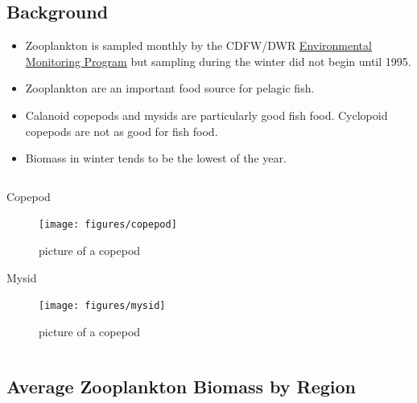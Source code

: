\documentclass[
]{book}
\providecommand{\tightlist}{%
  \setlength{\itemsep}{0pt}\setlength{\parskip}{0pt}}
\begin{document}
\begin{columns-nocenter}

\begin{column}

\hypertarget{background-3}{%
\subsection{Background}\label{background-3}}

\begin{itemize}
\tightlist
\item
  Zooplankton is sampled monthly by the CDFW/DWR \href{https://emp.baydeltalive.com/wiki/12297}{Environmental Monitoring Program} but sampling during the winter did not begin until 1995.
\item
  Zooplankton are an important food source for pelagic fish.
\item
  Calanoid copepods and mysids are particularly good fish food. Cyclopoid copepods are not as good for fish food.
\item
  Biomass in winter tends to be the lowest of the year.
\end{itemize}

\end{column}

\begin{column}

Copepod

\begin{figure}

{\centering \texttt{[image: figures/copepod]} 

}

\caption{picture of a copepod}\label{fig:unnamed-chunk-162}
\end{figure}

Mysid

\begin{figure}

{\centering \texttt{[image: figures/mysid]} 

}

\caption{picture of a copepod}\label{fig:unnamed-chunk-163}
\end{figure}

\end{column}

\end{columns-nocenter}

\hypertarget{average-zooplankton-biomass-by-region}{%
\subsection{Average Zooplankton Biomass by Region}\label{average-zooplankton-biomass-by-region}}
\end{document}
